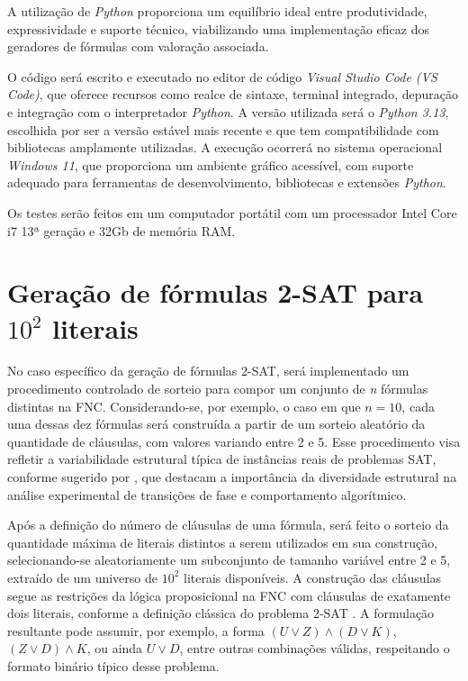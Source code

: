 A utilização de \textit{Python} proporciona um equilíbrio ideal entre produtividade, expressividade e suporte técnico, viabilizando uma implementação eficaz dos geradores de fórmulas com valoração associada.

O código será escrito e executado no editor de código \textit{Visual Studio Code (VS Code)}, que oferece recursos como realce de sintaxe, terminal integrado, depuração e integração com o interpretador \textit{Python}. A versão utilizada será o \textit{Python 3.13}, escolhida por ser a versão estável mais recente e que tem compatibilidade com bibliotecas amplamente utilizadas. A execução ocorrerá no sistema operacional \textit{Windows 11}, que proporciona um ambiente gráfico acessível, com suporte adequado para ferramentas de desenvolvimento, bibliotecas e extensões \textit{Python}.

Os testes serão feitos em um computador portátil com um processador Intel Core i7 13ª geração e 32Gb de memória RAM.

\section{Geração de fórmulas 2-SAT para $10^2$ literais}

No caso específico da geração de fórmulas 2-SAT, será implementado um procedimento controlado de sorteio para compor um conjunto de \textit{n} fórmulas distintas na FNC. Considerando-se, por exemplo, o caso em que $n = 10$, cada uma dessas dez fórmulas será construída a partir de um sorteio aleatório da quantidade de cláusulas, com valores variando entre 2 e 5. Esse procedimento visa refletir a variabilidade estrutural típica de instâncias reais de problemas SAT, conforme sugerido por , que destacam a importância da diversidade estrutural na análise experimental de transições de fase e comportamento algorítmico.

Após a definição do número de cláusulas de uma fórmula, será feito o sorteio da quantidade máxima de literais distintos a serem utilizados em sua construção, selecionando-se aleatoriamente um subconjunto de tamanho variável entre 2 e 5, extraído de um universo de $10^2$ literais disponíveis. A construção das cláusulas segue as restrições da lógica proposicional na FNC com cláusulas de exatamente dois literais, conforme a definição clássica do problema 2-SAT \cite{el2016computational}. A formulação resultante pode assumir, por exemplo, a forma $(U \lor Z) \land (D \lor K)$, $(Z \lor D) \land K$, ou ainda $U \lor D$, entre outras combinações válidas, respeitando o formato binário típico desse problema.

